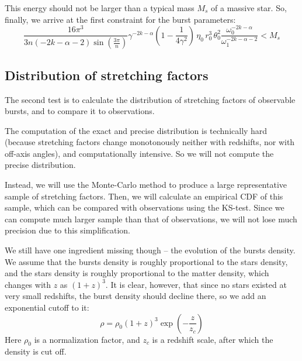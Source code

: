 \documentclass{article}
\begin{document}
This energy should not be larger than a typical mass $M_s$ of a massive star. So, finally, we arrive at the first constraint for the burst parameters:
\begin{equation}
\frac{16\pi^3}{3 n\left(-2k-\alpha-2\right)\sin\left(\frac{3\pi}{n}\right)} \gamma^{-2k-\alpha} \left(1 - \frac{1}{4\gamma^2}\right) \, \eta_0 \, r_0^3 \, \theta_0^2 \frac{\omega_0^{-2k-\alpha}}{\omega_1^{-2k-\alpha-2}} < M_s
\end{equation}

\subsection{Distribution of stretching factors}
\label{sec:distribution}

The second test is to calculate the distribution of stretching factors of observable bursts, and to compare it to observations.

The computation of the exact and precise distribution is technically hard (because stretching factors change monotonously neither with redshifts, nor with off-axis angles), and computationally intensive. So we will not compute the precise distribution.

Instead, we will use the Monte-Carlo method to produce a large representative sample of stretching factors. Then, we will calculate an empirical CDF of this sample, which can be compared with observations using the KS-test. Since we can compute much larger sample than that of observations, we will not lose much precision due to this simplification.

We still have one ingredient missing though -- the evolution of the bursts density. We assume that the bursts density is roughly proportional to the stars density, and the stars density is roughly proportional to the matter density, which changes with $z$ as $\left(1+z\right)^3$. It is clear, however, that since no stars existed at very small redshifts, the burst density should decline there, so we add an exponential cutoff to it:
\begin{equation}
\rho = \rho_0 \left(1+z\right)^3 \exp\left(-\frac{z}{z_c}\right)
\end{equation}
Here $\rho_0$ is a normalization factor, and $z_c$ is a redshift scale, after which the density is cut off.
\end{document}
